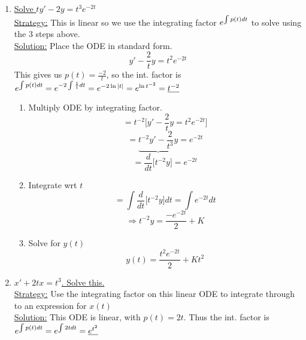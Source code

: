 \begin{enumerate}[label=\protect\circled{\Roman*}]
	\item {\Large \underline{Solve $ty' - 2y = t^3e^{-2t}$}}\\
	\newline
	\underline{\large Strategy:} This is linear so we use the integrating factor $e^{\int p(t) dt}$ to solve using the 3 steps above.\\
	\underline{\large Solution:} Place the ODE in standard form.
	\begin{equation*}
		y' - \frac{2}{t}y = t^2e^{-2t}
	\end{equation*}
	This gives us $p(t) = \frac{-2}{t}$, so the int. factor is $e^{\int p(t) dt} = e^{-2 \int \frac{1}{t}dt} = e^{-2 \ln |t|} = e^{\ln t^{-2}} = \underline{t^{-2}}$
	\begin{enumerate}[label=\textbf{Step \arabic*:}]
	
	\setlength{\itemindent}{1.3in}
	\item Multiply ODE by integrating factor.
	\begin{equation*}
		= t^{-2}\bigg[y'-\frac{2}{t}y = t^2e^{-2t}\bigg]
	\end{equation*}
	\begin{equation*}
		= \underbrace{t^{-2}y'-\frac{2}{t^3}y} = e^{-2t}
	\end{equation*}
	\begin{equation*}
		= \dfrac{d}{dt}\big[t^{-2}y\big] = e^{-2t}
	\end{equation*}
	\item Integrate wrt $t$
	\begin{equation*}
		= \int \dfrac{d}{dt}\big[t^{-2}y\big] dt = \int e^{-2t} dt
	\end{equation*}
	\begin{equation*}
		\Rightarrow t^{-2}y = \frac{-e^{-2t}}{2} + K
	\end{equation*}
	\item Solve for $y(t)$
	\begin{equation*}
		\boxed{y(t) = \frac{t^2e^{-2t}}{2} + Kt^2} \tag{this solves the ODE}
	\end{equation*}
	
	\end{enumerate}
	
	\item {\Large \underline{$x' + 2tx = t^3$. Solve this.}}\\
	\newline
	\underline{\large Strategy:} Use the integrating factor on this linear ODE to integrate through to an expression for $x(t)$\\
	\underline{\large Solution:} This ODE is linear, with $p(t) = 2t$. Thus the int. factor is $e^{\int p(t) dt} = e^{\int 2tdt} = \underline{e^{t^2}}$
	

\end{enumerate}
